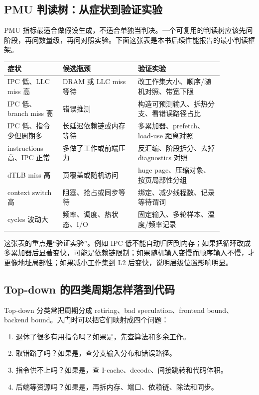 \subsection{PMU 判读树：从症状到验证实验}

PMU 指标最适合做假设生成，不适合单独当判决。一个可复用的判读树应该先问阶段，再问数量级，再问对照实验。下面这张表是本书后续性能报告的最小判读框架。

\begin{center}
\begin{tabular}{p{0.22\linewidth}p{0.30\linewidth}p{0.34\linewidth}}
\toprule
症状 & 候选瓶颈 & 验证实验 \\
\midrule
IPC 低、LLC miss 高 & DRAM 或 LLC miss 等待 & 改工作集大小、顺序/随机对照、带宽下限 \\
IPC 低、branch miss 高 & 错误推测 & 构造可预测输入、拆热分支、看错误路径占比 \\
IPC 低、指令少但周期多 & 长延迟依赖链或内存等待 & 多累加器、prefetch、load-use 距离对照 \\
instructions 高、IPC 正常 & 多做了工作或前端压力 & 反汇编、阶段拆分、去掉 diagnostics 对照 \\
dTLB miss 高 & 页覆盖或随机访问 & huge page、压缩对象、按页局部性分组 \\
context switch 高 & 阻塞、抢占或同步等待 & 绑定、减少线程数、记录等待谓词 \\
cycles 波动大 & 频率、调度、热状态、I/O & 固定输入、多轮样本、温度/频率记录 \\
\bottomrule
\end{tabular}
\end{center}

这张表的重点是“验证实验”。例如 IPC 低不能自动归因到内存；如果把循环改成多累加器后显著变快，可能是依赖链限制；如果随机输入变慢而顺序输入不慢，才更像地址局部性；如果减小工作集到 L2 后变快，说明层级位置影响明显。

\subsection{Top-down 的四类周期怎样落到代码}

Top-down 分类常把周期分成 retiring、bad speculation、frontend bound、backend bound。入门时可以把它们映射成四个问题：

\begin{enumerate}
  \item 退休了很多有用指令吗？如果是，先查算法和多余工作。
  \item 取错路了吗？如果是，查分支输入分布和错误路径。
  \item 指令供不上吗？如果是，查 I-cache、decode、间接跳转和代码体积。
  \item 后端等资源吗？如果是，再拆内存、端口、依赖链、除法和同步。
\end{enumerate}

